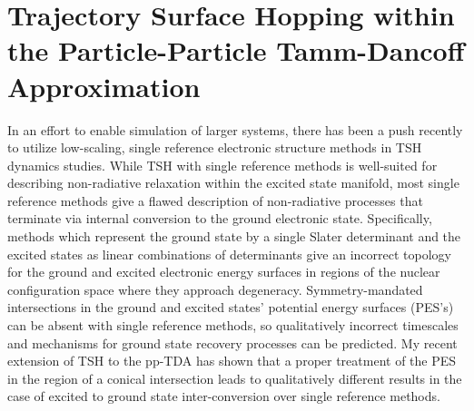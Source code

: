 \linespread{1.0}
\section{Trajectory Surface Hopping within the Particle-Particle Tamm-Dancoff Approximation}
\mylinesp
\label{sec:pp-TSH}

In an effort to enable simulation of larger systems, there has been a push
recently to utilize low-scaling, single reference electronic structure methods
in TSH dynamics studies.\cite{Lan15_1360,Rothlisberger07_023001,Li16_935} While
TSH with single reference  methods is well-suited for describing non-radiative
relaxation within the excited state
manifold\cite{Subotnik14_4253,Barbatti14_1395}, most single reference  methods
give a flawed description of non-radiative processes that terminate via internal
conversion to the ground electronic state.  Specifically, methods which
represent the ground state by a single Slater determinant and the excited states
as linear combinations of determinants give an incorrect topology for the ground
and excited electronic energy surfaces in regions of the nuclear configuration
space where they approach degeneracy.\cite{Massimo14_3074, Martinez06_1039}
Symmetry-mandated intersections in the ground and excited states' potential
energy surfaces (PES's) can be absent with single reference methods, so
qualitatively incorrect timescales and mechanisms for ground state recovery
processes  can be predicted.  My recent extension of TSH to the pp-TDA
\cite{DBWY16_Submitted1} has shown that a proper treatment of the PES in the
region of a conical intersection leads to qualitatively different results in the
case of excited to ground state inter-conversion over single reference methods.

